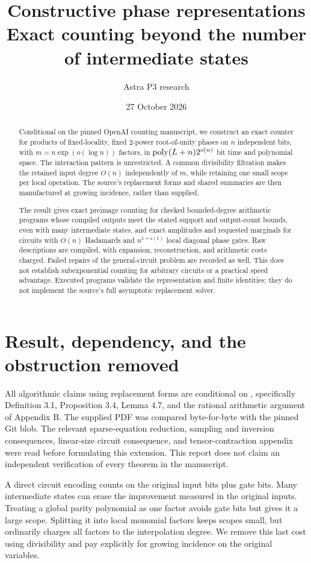 \documentclass[11pt,a4paper]{article}
\title{Constructive phase representations\\\large Exact counting beyond the number of intermediate states}
\author{Astra P3 research}\date{27 October 2026}
\theoremstyle{remark}\newtheorem{remark}[theorem]{Remark}
\begin{document}
\maketitle
\begin{abstract}
Conditional on the pinned OpenAI counting manuscript, we construct an exact
counter for products of fixed-locality, fixed $2$-power root-of-unity phases
on $n$ independent bits, with $m=n\exp(o(\log n))$ factors, in
$\operatorname{poly}(L+n)2^{o(n)}$ bit time and polynomial space. The interaction pattern
is unrestricted. A common divisibility filtration makes the retained input
degree $O(n)$ independently of $m$, while retaining one small scope per
local operation. The source's replacement forms and shared summaries are
then manufactured at growing incidence, rather than supplied.

The result gives exact preimage counting for checked bounded-degree
arithmetic programs whose compiled outputs meet the stated support and
output-count bounds, even with many intermediate states, and exact amplitudes
and requested marginals for circuits with $O(n)$ Hadamards and
$n^{1+o(1)}$ local diagonal phase gates. Raw descriptions are compiled,
with expansion, reconstruction, and arithmetic costs charged. Failed
repairs of the general-circuit problem are recorded as well. This does
not establish subexponential counting for arbitrary circuits or a
practical speed advantage. Executed programs validate the representation
and finite identities; they do not implement the source's full
asymptotic replacement solver.
\end{abstract}

\section{Result, dependency, and the obstruction removed}
All algorithmic claims using replacement forms are conditional on
\cite{governing}, specifically Definition 3.1, Proposition 3.4,
Lemma 4.7, and the rational arithmetic argument of Appendix B. The supplied
PDF was compared byte-for-byte with the pinned Git blob. The relevant
sparse-equation reduction, sampling and inversion consequences,
linear-size circuit consequence, and tensor-contraction appendix were
read before formulating this extension. This report does not claim an
independent verification of every theorem in the manuscript.

A direct circuit encoding counts on the original input bits plus gate
bits. Many intermediate states can erase the improvement measured in
the original inputs. Treating a global parity polynomial as one factor
avoids gate bits but gives it a large scope. Splitting it into local
monomial factors keeps scopes small, but ordinarily charges all factors
to the interpolation degree. We remove this last cost using divisibility
and pay explicitly for growing incidence on the original variables.
\end{document}
